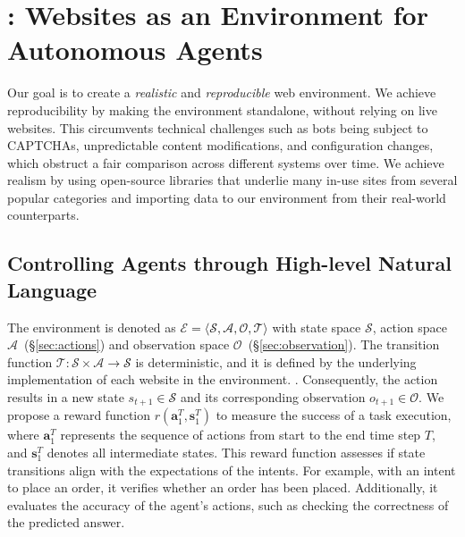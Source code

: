 \section{\ours: Websites as an Environment for Autonomous Agents}\label{sec:webarena}
Our goal is to create a \emph{realistic} and \emph{reproducible} web environment. We achieve reproducibility by making the environment standalone, without relying on live websites. This circumvents technical challenges such as bots being subject to CAPTCHAs, unpredictable content modifications, and configuration changes, which obstruct a fair comparison across different systems over time. We achieve realism by using open-source libraries that underlie many in-use sites from several popular categories and importing data to our environment from their real-world counterparts.

\subsection{Controlling Agents through High-level Natural Language}
The \ours environment is denoted as $\mathcal{E}$\textcolor{black}{$=\langle \mathcal{S},\mathcal{A},\mathcal{O},\mathcal{T} \rangle$} with state space $\mathcal{S}$, action space $\mathcal{A}$~(\S\ref{sec:actions}) and observation space $\mathcal{O}$~(\S\ref{sec:observation}).
The transition function $\mathcal{T}: \mathcal{S} \times \mathcal{A}$\textcolor{black}{$\longrightarrow \mathcal{S}$} is deterministic, and it is defined by the underlying implementation of each website in the environment.
.
Consequently, the action results in a new state $s_{t+1}$\textcolor{black}{$\in \mathcal{S}$} and its corresponding observation $o_{t+1}$\textcolor{black}{$\in \mathcal{O}$}. 
We propose a reward function $r(\mathbf{a}_{1}^{T}, \mathbf{s}_{1}^{T})$ to measure the success of a task execution, where $\mathbf{a}_{1}^{T}$ represents the sequence of actions from start to the end time step $T$, and $\mathbf{s}_{1}^{T}$ denotes all intermediate states. 
This reward function assesses if state transitions align with the expectations of the intents. For example, with an intent to place an order, it verifies whether an order has been placed. Additionally, it evaluates the accuracy of the agent's actions, such as checking the correctness of the predicted answer.

